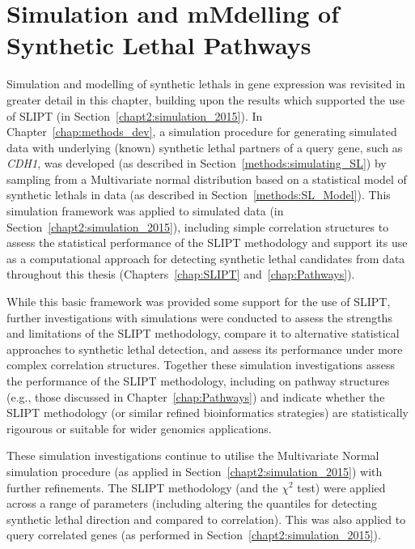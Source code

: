 \chapter{Simulation and mMdelling of Synthetic Lethal Pathways}
\label{chap:simulation}

Simulation and modelling of \glspl{synthetic lethal} in \gls{gene expression} was revisited in greater detail in this chapter, building upon the results which supported the use of \gls{SLIPT} (in Section~\ref{chapt2:simulation_2015}). In Chapter~\ref{chap:methods_dev}, a simulation procedure for generating simulated data with underlying (known) \gls{synthetic lethal} partners of a query gene, such as \textit{CDH1}, was developed (as described in Section~\ref{methods:simulating_SL}) by sampling from a Multivariate normal distribution based on a statistical model of \glspl{synthetic lethal} in  data (as described in Section~\ref{methods:SL_Model}). This simulation framework was applied to simulated data (in Section~\ref{chapt2:simulation_2015}), including simple correlation structures to assess the statistical performance of the \gls{SLIPT} methodology and support its use as a computational approach for detecting \gls{synthetic lethal} candidates from  data throughout this thesis (Chapters~\ref{chap:SLIPT} and~\ref{chap:Pathways}). 

While this basic framework was provided some support for the use of \gls{SLIPT}, further investigations with simulations were conducted to assess the strengths and limitations of the \gls{SLIPT} methodology, compare it to alternative statistical approaches to \gls{synthetic lethal} detection, and assess its performance under more complex correlation structures. Together these simulation investigations assess the performance of the \gls{SLIPT} methodology, including on pathway  structures (e.g., those discussed in Chapter~\ref{chap:Pathways}) and indicate whether the \gls{SLIPT} methodology (or similar refined \gls{bioinformatics} strategies) are statistically rigourous or suitable for wider \glspl{genomic} applications.

These simulation investigations continue to utilise the Multivariate Normal simulation procedure (as applied in Section~\ref{chapt2:simulation_2015}) with further refinements. The \gls{SLIPT} methodology (and the $\chi^2$ test) were applied across a range of parameters (including altering the quantiles for detecting \gls{synthetic lethal} direction and compared to correlation). This was also applied to query correlated genes (as performed in Section~\ref{chapt2:simulation_2015}).

